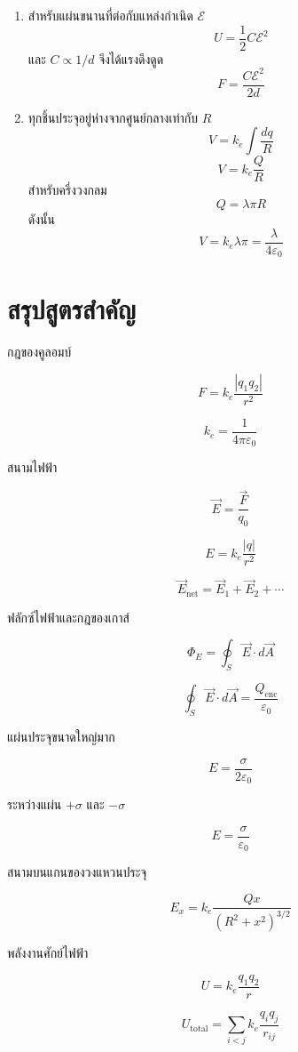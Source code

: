 \begin{enumerate}
    โมเมนตัมรวมคงตัว ที่ระยะใกล้ที่สุดความเร็วสัมพัทธ์เป็นศูนย์ ทั้งสองประจุมีความเร็วร่วมกัน
    \[
    V=\frac{m}{m+M}u
    \]
    ถ้า
    \[
    K=\frac{1}{2}mu^2
    \]
    พลังงานจลน์ของการเคลื่อนที่ของจุดศูนย์กลางมวลที่จุดใกล้ที่สุดคือ
    \[
    K_{\text{cm}}=\frac{m}{m+M}K
    \]
    ใช้พลังงาน
    \[
    K=K_{\text{cm}}+k_e\frac{qQ}{D}
    \]
    \[
    K\left(1-\frac{m}{m+M}\right)=k_e\frac{qQ}{D}
    \]
    \[
    K\frac{M}{m+M}=k_e\frac{qQ}{D}
    \]
    ดังนั้น
    \[
    K=\frac{m+M}{M}k_e\frac{qQ}{D}
    \]

    \item
    สำหรับแผ่นขนานที่ต่อกับแหล่งกำเนิด $\mathcal{E}$
    \[
    U=\frac{1}{2}C\mathcal{E}^2
    \]
    และ $C\propto 1/d$ จึงได้แรงดึงดูด
    \[
    F=\frac{C\mathcal{E}^2}{2d}
    \]

    \item
    ทุกชิ้นประจุอยู่ห่างจากศูนย์กลางเท่ากับ $R$
    \[
    V=k_e\int\frac{dq}{R}
    \]
    \[
    V=k_e\frac{Q}{R}
    \]
    สำหรับครึ่งวงกลม
    \[
    Q=\lambda\pi R
    \]
    ดังนั้น
    \[
    V=k_e\lambda\pi=\frac{\lambda}{4\varepsilon_0}
    \]
\end{enumerate}

\section{สรุปสูตรสำคัญ}

\begin{tcolorbox}[title=สรุปบท: ไฟฟ้าสถิต]
กฎของคูลอมบ์

\[
F=k_e\frac{|q_1q_2|}{r^2}
\]

\[
k_e=\frac{1}{4\pi\varepsilon_0}
\]

สนามไฟฟ้า

\[
\vec{E}=\frac{\vec{F}}{q_0}
\]

\[
E=k_e\frac{|q|}{r^2}
\]

\[
\vec{E}_{\text{net}}=\vec{E}_1+\vec{E}_2+\cdots
\]

ฟลักซ์ไฟฟ้าและกฎของเกาส์

\[
\Phi_E=\oint_S\vec{E}\cdot d\vec{A}
\]

\[
\oint_S\vec{E}\cdot d\vec{A}=\frac{Q_{\text{enc}}}{\varepsilon_0}
\]

แผ่นประจุขนาดใหญ่มาก

\[
E=\frac{\sigma}{2\varepsilon_0}
\]

ระหว่างแผ่น $+\sigma$ และ $-\sigma$

\[
E=\frac{\sigma}{\varepsilon_0}
\]

สนามบนแกนของวงแหวนประจุ

\[
E_x=k_e\frac{Qx}{(R^2+x^2)^{3/2}}
\]

พลังงานศักย์ไฟฟ้า

\[
U=k_e\frac{q_1q_2}{r}
\]

\[
U_{\text{total}}=\sum_{i<j}k_e\frac{q_iq_j}{r_{ij}}
\]
\end{tcolorbox}

